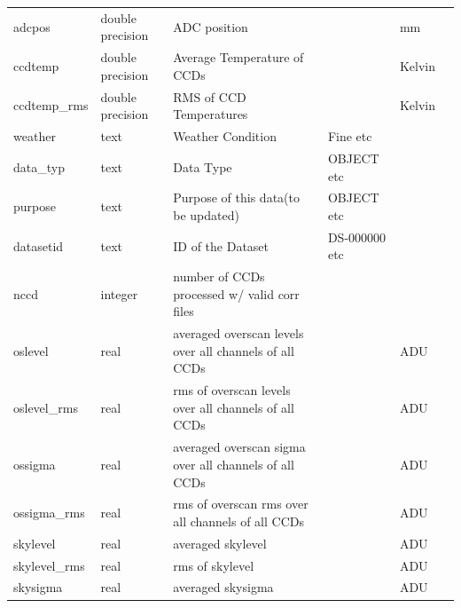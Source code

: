 \documentclass[12pt]{article}
\begin{document}
\begin{table}[thbp]
\begin{center}
{\begin{tabular}{llllll}
adcpos & double precision & ADC position                                             &                           & mm               &             \\
ccdtemp & double precision & Average Temperature of CCDs                              &                           & Kelvin           &             \\
ccdtemp\_rms & double precision & RMS of CCD Temperatures                                  &                           & Kelvin           &             \\
weather & text & Weather Condition                                        & Fine etc                  &                  &             \\
data\_typ & text & Data Type                                                & OBJECT etc                &                  &             \\
purpose & text & Purpose of this data(to be updated)                      & OBJECT etc                &                  &             \\
datasetid & text & ID of the Dataset                                        & DS-000000 etc             &                  &             \\
nccd & integer & number of CCDs processed w/ valid corr files             &                           &                  &             \\
oslevel & real & averaged overscan levels over all channels of all CCDs   &                           & ADU              &             \\
oslevel\_rms & real & rms of overscan levels over all channels of all CCDs     &                           & ADU              &             \\
ossigma & real & averaged overscan sigma over all channels of all CCDs    &                           & ADU              &             \\
ossigma\_rms & real & rms of overscan rms over all channels of all CCDs        &                           & ADU              &             \\
skylevel & real & averaged skylevel                                        &                           & ADU              &             \\
skylevel\_rms & real & rms of skylevel                                          &                           & ADU              &             \\
skysigma & real & averaged skysigma                                        &                           & ADU              &             \\

\end{tabular}}
\end{center}
\end{table}
\end{document}
